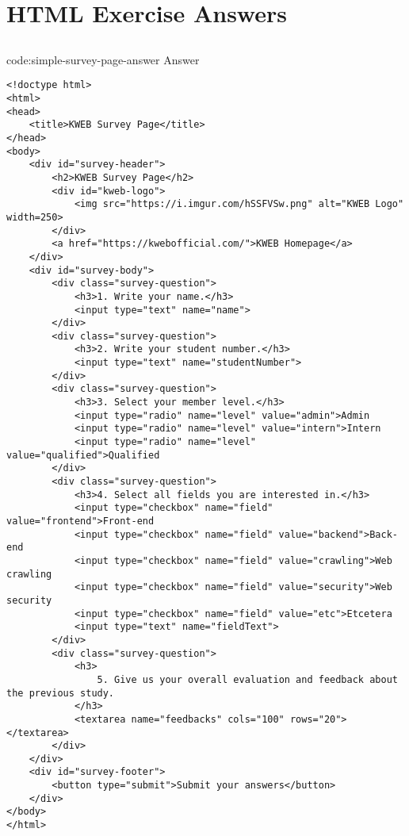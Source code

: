 \section{HTML Exercise Answers}\label{sect:html-exercise-answers}

\subsection*{}

\begin{codeenv}{code:simple-survey-page-answer}{ Answer}\begin{verbatim}
<!doctype html>
<html>
<head>
    <title>KWEB Survey Page</title>
</head>
<body>
    <div id="survey-header">
        <h2>KWEB Survey Page</h2>
        <div id="kweb-logo">
            <img src="https://i.imgur.com/hSSFVSw.png" alt="KWEB Logo" width=250>
        </div>
        <a href="https://kwebofficial.com/">KWEB Homepage</a>
    </div>
    <div id="survey-body">
        <div class="survey-question">
            <h3>1. Write your name.</h3>
            <input type="text" name="name">
        </div>
        <div class="survey-question">
            <h3>2. Write your student number.</h3>
            <input type="text" name="studentNumber">
        </div>
        <div class="survey-question">
            <h3>3. Select your member level.</h3>
            <input type="radio" name="level" value="admin">Admin
            <input type="radio" name="level" value="intern">Intern
            <input type="radio" name="level" value="qualified">Qualified
        </div>
        <div class="survey-question">
            <h3>4. Select all fields you are interested in.</h3>
            <input type="checkbox" name="field" value="frontend">Front-end
            <input type="checkbox" name="field" value="backend">Back-end
            <input type="checkbox" name="field" value="crawling">Web crawling
            <input type="checkbox" name="field" value="security">Web security
            <input type="checkbox" name="field" value="etc">Etcetera
            <input type="text" name="fieldText">
        </div>
        <div class="survey-question">
            <h3>
                5. Give us your overall evaluation and feedback about the previous study.
            </h3>
            <textarea name="feedbacks" cols="100" rows="20"></textarea>
        </div>
    </div>
    <div id="survey-footer">
        <button type="submit">Submit your answers</button>
    </div>
</body>
</html>
\end{verbatim}
\end{codeenv}
